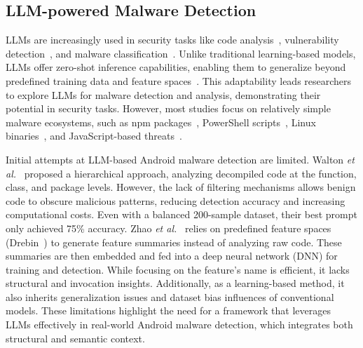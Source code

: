 \subsection{LLM-powered Malware Detection}

LLMs are increasingly used in security tasks like code analysis~\cite{code_sum}, vulnerability detection~\cite{llm4vuln,llm4vuln_bench}, and malware classification~\cite{llm_syscall}. Unlike traditional learning-based models, LLMs offer zero-shot inference capabilities, enabling them to generalize beyond predefined training data and feature spaces~\cite{large_zero,toolformer}. This adaptability leads researchers to explore LLMs for malware detection and analysis, demonstrating their potential in security tasks. However, most studies focus on relatively simple malware ecosystems, such as npm packages~\cite{npm_malware}, PowerShell scripts~\cite{raconteur}, Linux binaries~\cite{llm_syscall}, and JavaScript-based threats~\cite{tactics}.

Initial attempts at LLM-based Android malware detection are limited. Walton \textit{et al.}~\cite{malware_exploring} proposed a hierarchical approach, analyzing decompiled code at the function, class, and package levels. However, the lack of filtering mechanisms allows benign code to obscure malicious patterns, reducing detection accuracy and increasing computational costs. Even with a balanced 200-sample dataset, their best prompt only achieved 75\% accuracy. Zhao \textit{et al.}~\cite{apppoet} relies on predefined feature spaces (Drebin~\cite{Arpdrebin}) to generate feature summaries instead of analyzing raw code. These summaries are then embedded and fed into a deep neural network (DNN) for training and detection. While focusing on the feature's name is efficient, it lacks structural and invocation insights. Additionally, as a learning-based method, it also inherits generalization issues and dataset bias influences of conventional models. These limitations highlight the need for a framework that leverages LLMs effectively in real-world Android malware detection, which integrates both structural and semantic context.




